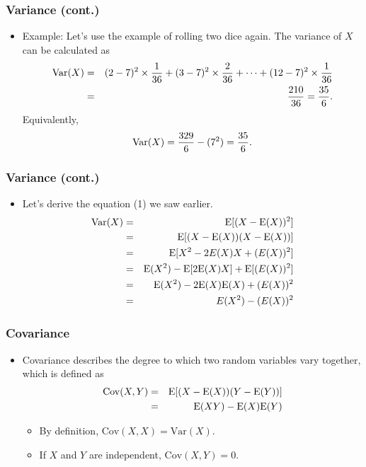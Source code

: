\documentclass[pdflatex, 12pt]{beamer}
\begin{document}
\begin{frame}
\frametitle{Variance (cont.)}
\begin{itemize}
\item Example: Let's use the example of rolling two dice again. The variance of $X$ can be calculated as
 {\small
 \begin{eqnarray}
 \mathrm{Var}(X) &=& (2 - 7)^2 \times \frac{1}{36} + (3 - 7)^2 \times \frac{2}{36} + \cdots + (12 - 7)^2 \times \frac{1}{36} \notag \\
 &=& \frac{210}{36} = \frac{35}{6}. \notag 
 \end{eqnarray}
 }
Equivalently,
 \begin{equation}
 \mathrm{Var}(X) = \frac{329}{6} - (7^2) = \frac{35}{6}. \notag 
 \end{equation}
\end{itemize}
\end{frame}

\begin{frame}
\frametitle{Variance (cont.)}
\begin{itemize}
\item Let's derive the equation (1) we saw earlier. 
 \begin{eqnarray}
 \mathrm{Var}(X) &=& \mathrm{E}[(X - \mathrm{E}(X))^2] \notag \\
 &=& \mathrm{E}[(X - \mathrm{E}(X))(X - \mathrm{E}(X))] \notag \\
 &=& \mathrm{E}[X^2 - 2E(X)X + (E(X))^2] \notag \\
 &=& \mathrm{E}(X^2) - \mathrm{E}[2\mathrm{E}(X)X] + \mathrm{E}[(E(X))^2] \notag \\
 &=& \mathrm{E}(X^2) - 2\mathrm{E}(X)\mathrm{E}(X) + (E(X))^2 \notag \\
 &=& E(X^2) - (E(X))^2 \notag
 \end{eqnarray}
\end{itemize}
\end{frame}

\begin{frame}
\frametitle{Covariance}
\begin{itemize}
\item Covariance describes the degree to which two random variables vary together, which is defined as
 \begin{eqnarray}
 \mathrm{Cov}(X, Y) &=& \mathrm{E}[(X - \mathrm{E}(X))(Y - \mathrm{E}(Y))] \notag \\
 &=& \mathrm{E}(XY) - \mathrm{E}(X)\mathrm{E}(Y) \notag 
 \end{eqnarray}
 \begin{itemize}
 \item By definition, $\mathrm{Cov}(X, X) = \mathrm{Var}(X)$.
 \item If $X$ and $Y$ are independent, $\mathrm{Cov}(X, Y) = 0$.
 \end{itemize}
\end{itemize}
\end{frame}
\end{document}
